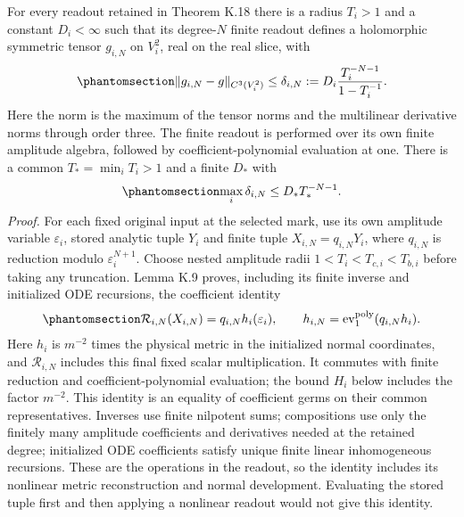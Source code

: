 \documentclass[
  english,
  11pt,
  reqno]{amsart}
\begin{document}
For every readout retained in Theorem K.18 there is a radius \(T_i>1\)
and a constant \(D_i<\infty\) such that its degree-\(N\) finite readout
defines a holomorphic symmetric tensor \(g_{i,N}\) on \(V_i^2\), real on
the real slice, with
\begin{equation}\protect\phantomsection\label{eq:fro-a-local-tail}{
 \|g_{i,N}-g\|_{C^3(V_i^2)}
 \le\delta_{i,N}
 :=D_i\frac{T_i^{-N-1}}{1-T_i^{-1}}.
}\end{equation} Here the norm is the maximum of the tensor norms and the
multilinear derivative norms through order three. The finite readout is
performed over its own finite amplitude algebra, followed by
coefficient-polynomial evaluation at one. There is a common
\(T_*=\min_iT_i>1\) and a finite \(D_*\) with
\begin{equation}\protect\phantomsection\label{eq:fro-a-uniform-tail}{
 \max_i\delta_{i,N}\le D_*T_*^{-N-1}.
}\end{equation} \emph{Proof.} For each fixed original input at the
selected mark, use its own amplitude variable \(\varepsilon_i\), stored
analytic tuple \(Y_i\) and finite tuple \(X_{i,N}=q_{i,N}Y_i\), where
\(q_{i,N}\) is reduction modulo \(\varepsilon_i^{N+1}\). Choose nested
amplitude radii \(1<T_i<T_{c,i}<T_{b,i}\) before taking any truncation.
Lemma K.9 proves, including its finite inverse and initialized ODE
recursions, the coefficient identity
\begin{equation}\protect\phantomsection\label{eq:fro-a-finite-readout-identity}{
 \mathcal R_{i,N}(X_{i,N})
       =q_{i,N}h_i(\varepsilon_i),
 \qquad
 h_{i,N}=\operatorname{ev}^{\mathrm{poly}}_1
                             (q_{i,N}h_i).
}\end{equation} Here \(h_i\) is \(m^{-2}\) times the physical metric in
the initialized normal coordinates, and \(\mathcal R_{i,N}\) includes
this final fixed scalar multiplication. It commutes with finite
reduction and coefficient-polynomial evaluation; the bound \(H_i\) below
includes the factor \(m^{-2}\). This identity is an equality of
coefficient germs on their common representatives. Inverses use finite
nilpotent sums; compositions use only the finitely many amplitude
coefficients and derivatives needed at the retained degree; initialized
ODE coefficients satisfy unique finite linear inhomogeneous recursions.
These are the operations in the readout, so the identity includes its
nonlinear metric reconstruction and normal development. Evaluating the
stored tuple first and then applying a nonlinear readout would not give
this identity.
\end{document}
